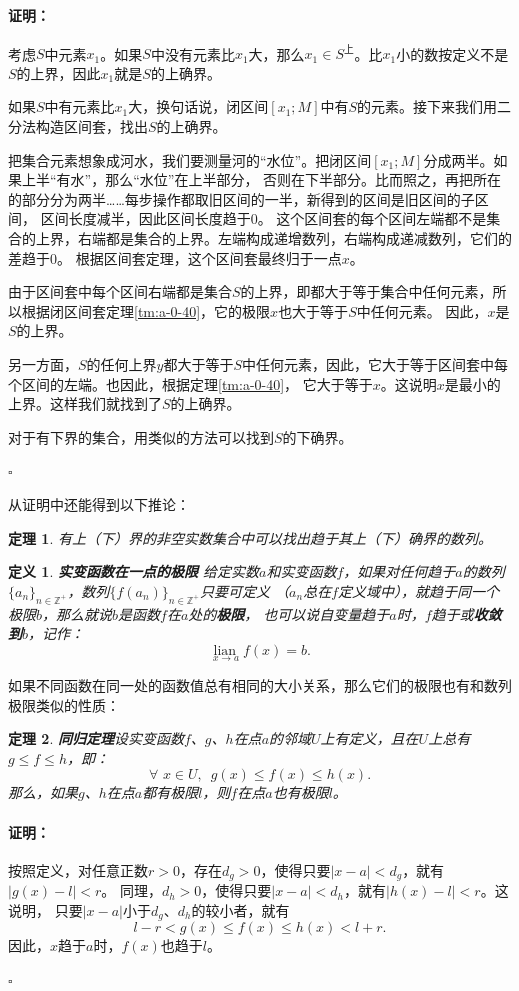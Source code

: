 \documentclass[12pt,UTF8]{ctexbook}
\newcommand{\lian}[1]{
    \underset{#1}{\operatorname{lian}\,}
}
\newtheorem{df}{定义}[section]
\newtheorem{tm}{定理}[section]
\renewenvironment{proof}{\paragraph{\textbf{证明：}}}{\hfill$\square$}
\begin{document}
\begin{appendix}
\begin{proof}
    考虑$S$中元素$x_1$。如果$S$中没有元素比$x_1$大，那么$x_1\in S^{\text{上}}$。比$x_1$小的数按定义不是$S$的上界，因此$x_1$就是$S$的上确界。

    如果$S$中有元素比$x_1$大，换句话说，闭区间$[x_1; M]$中有$S$的元素。接下来我们用二分法构造区间套，找出$S$的上确界。

    把集合元素想象成河水，我们要测量河的“水位”。把闭区间$[x_1; M]$分成两半。如果上半“有水”，那么“水位”在上半部分，
    否则在下半部分。比而照之，再把所在的部分分为两半……每步操作都取旧区间的一半，新得到的区间是旧区间的子区间，
    区间长度减半，因此区间长度趋于$0$。
    这个区间套的每个区间左端都不是集合的上界，右端都是集合的上界。左端构成递增数列，右端构成递减数列，它们的差趋于$0$。
    根据区间套定理，这个区间套最终归于一点$x$。

    由于区间套中每个区间右端都是集合$S$的上界，即都大于等于集合中任何元素，所以根据闭区间套定理\ref{tm:a-0-40}，它的极限$x$也大于等于$S$中任何元素。
    因此，$x$是$S$的上界。
    
    另一方面，$S$的任何上界$y$都大于等于$S$中任何元素，因此，它大于等于区间套中每个区间的左端。也因此，根据定理\ref{tm:a-0-40}，
    它大于等于$x$。这说明$x$是最小的上界。这样我们就找到了$S$的上确界。

    对于有下界的集合，用类似的方法可以找到$S$的下确界。

\end{proof}

从证明中还能得到以下推论：
\begin{tm}\label{tm:b-0-5}
    有上（下）界的非空实数集合中可以找出趋于其上（下）确界的数列。
\end{tm}

\begin{df}\textbf{实变函数在一点的极限}
    给定实数$a$和实变函数$f$，如果对任何趋于$a$的数列$\{a_n\}_{n\in\mathbb{Z}^+}$，数列$\{f(a_n)\}_{n\in\mathbb{Z}^+}$只要可定义
    （$a_n$总在$f$定义域中），就趋于同一个极限$b$，那么就说$b$是函数$f$在$a$处的\textbf{极限}，
    也可以说自变量趋于$a$时，$f$趋于或\textbf{收敛到}$b$，记作：
    $$  \lian{x \to a} f(x) = b. $$
\end{df}

如果不同函数在同一处的函数值总有相同的大小关系，那么它们的极限也有和数列极限类似的性质：
\begin{tm}{\textbf{同归定理}}\label{tm:b-0-20}
    设实变函数$f$、$g$、$h$在点$a$的邻域$U$上有定义，且在$U$上总有$g \leqslant f \leqslant h $，即：
    $$ \forall \,\,x\in U,\,\,\, g(x) \leqslant f(x) \leqslant h(x).  $$
    那么，如果$g$、$h$在点$a$都有极限$l$，则$f$在点$a$也有极限$l$。
\end{tm}
\begin{proof}
    按照定义，对任意正数$r>0$，存在$d_g>0$，使得只要$|x - a| < d_g$，就有$|g(x) - l| < r$。
    同理，$d_h>0$，使得只要$|x - a| < d_h$，就有$|h(x) - l| < r$。这说明，
    只要$|x - a|$小于$d_g$、$d_h$的较小者，就有
    $$ l - r < g(x) \leqslant f(x) \leqslant h(x) < l + r. $$
    因此，$x$趋于$a$时，$f(x)$也趋于$l$。


\end{proof}
\end{appendix}
\end{document}
